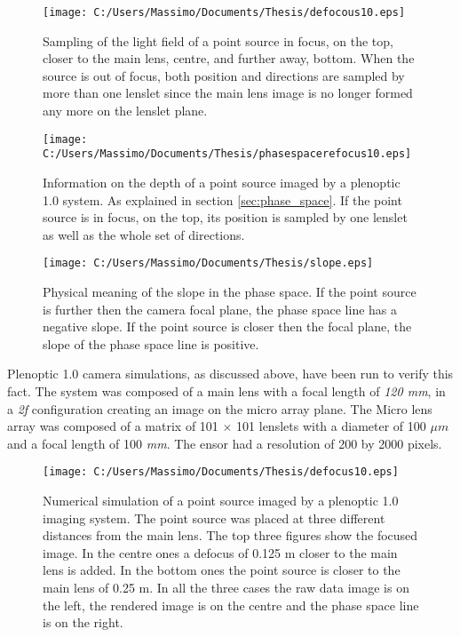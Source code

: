  \begin{figure}[H]
 	\centering
 	\texttt{[image: C:/Users/Massimo/Documents/Thesis/defocous10.eps]}
 	\caption{\label{fig:depth} Sampling of the light field of a point source in focus, on the top, closer to the main lens, centre, and further away, bottom. When the source is out of focus, both position and directions are sampled by more than one lenslet since the main lens image is no longer formed any more on the lenslet plane. }
 \end{figure}
 \begin{figure}[H]
 	\centering
 	\texttt{[image: C:/Users/Massimo/Documents/Thesis/phasespacerefocus10.eps]}
 	\caption{\label{fig:depth1} Information on the depth of a point source imaged by a plenoptic 1.0 system. As explained in section \ref{sec:phase_space}. If the point source is in focus, on the top, its position is sampled by one lenslet as well as the whole set of directions.}
 \end{figure}
 \begin{figure}[H]
 	\centering
 	\texttt{[image: C:/Users/Massimo/Documents/Thesis/slope.eps]}
 	\caption{\label{fig:depth3} Physical meaning of the slope in the phase space. If the point source is further then the camera focal plane, the phase space line has a negative slope. If the point source is closer then the focal plane, the slope of the phase space line is positive.}
 \end{figure}
 Plenoptic 1.0 camera simulations, as discussed above, have been run to verify this fact. The system was composed of a main lens with a focal length of \textit{120 mm}, in a \textit{2f} configuration creating an image on the micro array plane. The Micro lens array was composed of a matrix of 101 $\times$ 101 lenslets with a diameter of 100 $\mu m$ and a focal length of 100 \textit{mm}. The ensor had a resolution of 200 by 2000 pixels.
 \begin{figure}[H]
 	\centering
 	\texttt{[image: C:/Users/Massimo/Documents/Thesis/defocus10.eps]}
 	\caption{\label{fig:depth4} Numerical simulation of a point source imaged by a plenoptic 1.0 imaging system. The point source was placed at three different distances from the main lens. The top three figures show the focused image. In the centre ones a defocus of 0.125 m closer to the main lens is added. In the bottom ones the point source is closer to the main lens of 0.25 m. In all the three cases the raw data image is on the left, the rendered image is on the centre and the phase space line is on the right.}
 \end{figure}
 \newpage
